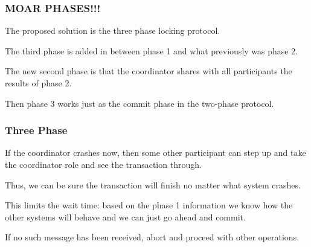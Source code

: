 \begin{frame}
\frametitle{MOAR PHASES!!!}

The proposed solution is the \alert{three phase locking protocol}. 

The third phase is added in between phase 1 and what previously was phase 2. 

The new second phase is that the coordinator shares with all participants the results of phase 2. 

Then phase 3 works just as the commit phase in the two-phase protocol.

\end{frame}

\begin{frame}
\frametitle{Three Phase}
If the coordinator crashes now, then some other participant can step up and take the coordinator role and see the transaction through. 

Thus, we can be sure the transaction will finish no matter what system crashes. 

This limits the wait time: based on the phase 1 information we know how the other systems will behave and we can just go ahead and commit. 

If no such message has been received, abort and proceed with other operations.

\end{frame}




